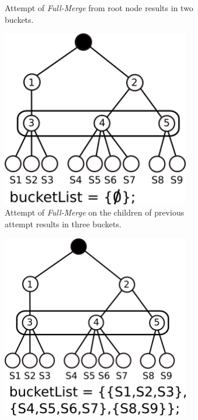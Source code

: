 \begin{figure}[h!]
\begin{subfigure}[t]{0.22\textwidth}
				\caption{Attempt of {\em Full-Merge} from root node results in two buckets.}
				\label{fig:trma-full-merge-p2}
		\end{subfigure}
		\hspace{3mm}
		\begin{subfigure}[t]{0.22\textwidth}
				\includegraphics[width=0.9\textwidth]{img/trma-full-merge3}
				\caption{Attempt of {\em Full-Merge} on the children of previous attempt results in three buckets.}
				\label{fig:trma-full-merge-p3}
		\end{subfigure}
		\hspace{3mm}
		\begin{subfigure}[t]{0.22\textwidth}
				\includegraphics[width=0.9\textwidth]{img/trma-full-merge4}

\end{subfigure}
\end{figure}
